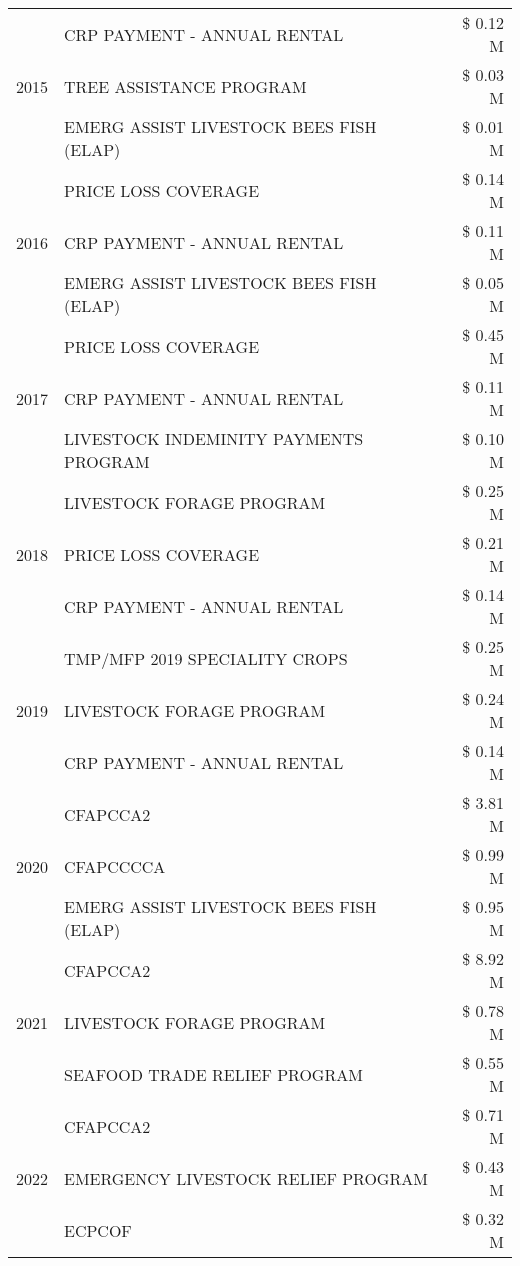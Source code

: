 \begin{tabular}{llr}
\cline{1-3}
\multirow[t]{3}{*}{2015} & CRP PAYMENT - ANNUAL RENTAL & \$ 0.12 M \\
 & TREE ASSISTANCE PROGRAM & \$ 0.03 M \\
 & EMERG ASSIST LIVESTOCK BEES FISH (ELAP) & \$ 0.01 M \\
\cline{1-3}
\multirow[t]{3}{*}{2016} & PRICE LOSS COVERAGE & \$ 0.14 M \\
 & CRP PAYMENT - ANNUAL RENTAL & \$ 0.11 M \\
 & EMERG ASSIST LIVESTOCK BEES FISH (ELAP) & \$ 0.05 M \\
\cline{1-3}
\multirow[t]{3}{*}{2017} & PRICE LOSS COVERAGE & \$ 0.45 M \\
 & CRP PAYMENT - ANNUAL RENTAL & \$ 0.11 M \\
 & LIVESTOCK INDEMINITY PAYMENTS PROGRAM & \$ 0.10 M \\
\cline{1-3}
\multirow[t]{3}{*}{2018} & LIVESTOCK FORAGE PROGRAM & \$ 0.25 M \\
 & PRICE LOSS COVERAGE & \$ 0.21 M \\
 & CRP PAYMENT - ANNUAL RENTAL & \$ 0.14 M \\
\cline{1-3}
\multirow[t]{3}{*}{2019} & TMP/MFP 2019 SPECIALITY CROPS & \$ 0.25 M \\
 & LIVESTOCK FORAGE PROGRAM & \$ 0.24 M \\
 & CRP PAYMENT - ANNUAL RENTAL & \$ 0.14 M \\
\cline{1-3}
\multirow[t]{3}{*}{2020} & CFAPCCA2 & \$ 3.81 M \\
 & CFAPCCCCA & \$ 0.99 M \\
 & EMERG ASSIST LIVESTOCK BEES FISH (ELAP) & \$ 0.95 M \\
\cline{1-3}
\multirow[t]{3}{*}{2021} & CFAPCCA2 & \$ 8.92 M \\
 & LIVESTOCK FORAGE PROGRAM & \$ 0.78 M \\
 & SEAFOOD TRADE RELIEF PROGRAM & \$ 0.55 M \\
\cline{1-3}
\multirow[t]{3}{*}{2022} & CFAPCCA2 & \$ 0.71 M \\
 & EMERGENCY LIVESTOCK RELIEF PROGRAM & \$ 0.43 M \\
 & ECPCOF & \$ 0.32 M \\
\cline{1-3}
\bottomrule
\end{tabular}
